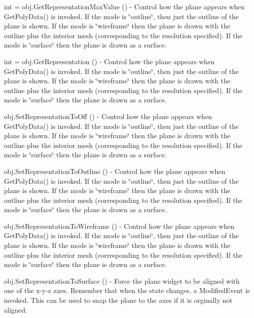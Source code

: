 \begin{DoxyItemize}
\item {\ttfamily int = obj.\-Get\-Representation\-Max\-Value ()} -\/ Control how the plane appears when Get\-Poly\-Data() is invoked. If the mode is \char`\"{}outline\char`\"{}, then just the outline of the plane is shown. If the mode is \char`\"{}wireframe\char`\"{} then the plane is drawn with the outline plus the interior mesh (corresponding to the resolution specified). If the mode is \char`\"{}surface\char`\"{} then the plane is drawn as a surface.  
\item {\ttfamily int = obj.\-Get\-Representation ()} -\/ Control how the plane appears when Get\-Poly\-Data() is invoked. If the mode is \char`\"{}outline\char`\"{}, then just the outline of the plane is shown. If the mode is \char`\"{}wireframe\char`\"{} then the plane is drawn with the outline plus the interior mesh (corresponding to the resolution specified). If the mode is \char`\"{}surface\char`\"{} then the plane is drawn as a surface.  
\item {\ttfamily obj.\-Set\-Representation\-To\-Off ()} -\/ Control how the plane appears when Get\-Poly\-Data() is invoked. If the mode is \char`\"{}outline\char`\"{}, then just the outline of the plane is shown. If the mode is \char`\"{}wireframe\char`\"{} then the plane is drawn with the outline plus the interior mesh (corresponding to the resolution specified). If the mode is \char`\"{}surface\char`\"{} then the plane is drawn as a surface.  
\item {\ttfamily obj.\-Set\-Representation\-To\-Outline ()} -\/ Control how the plane appears when Get\-Poly\-Data() is invoked. If the mode is \char`\"{}outline\char`\"{}, then just the outline of the plane is shown. If the mode is \char`\"{}wireframe\char`\"{} then the plane is drawn with the outline plus the interior mesh (corresponding to the resolution specified). If the mode is \char`\"{}surface\char`\"{} then the plane is drawn as a surface.  
\item {\ttfamily obj.\-Set\-Representation\-To\-Wireframe ()} -\/ Control how the plane appears when Get\-Poly\-Data() is invoked. If the mode is \char`\"{}outline\char`\"{}, then just the outline of the plane is shown. If the mode is \char`\"{}wireframe\char`\"{} then the plane is drawn with the outline plus the interior mesh (corresponding to the resolution specified). If the mode is \char`\"{}surface\char`\"{} then the plane is drawn as a surface.  
\item {\ttfamily obj.\-Set\-Representation\-To\-Surface ()} -\/ Force the plane widget to be aligned with one of the x-\/y-\/z axes. Remember that when the state changes, a Modified\-Event is invoked. This can be used to snap the plane to the axes if it is orginally not aligned.  

\end{DoxyItemize}
